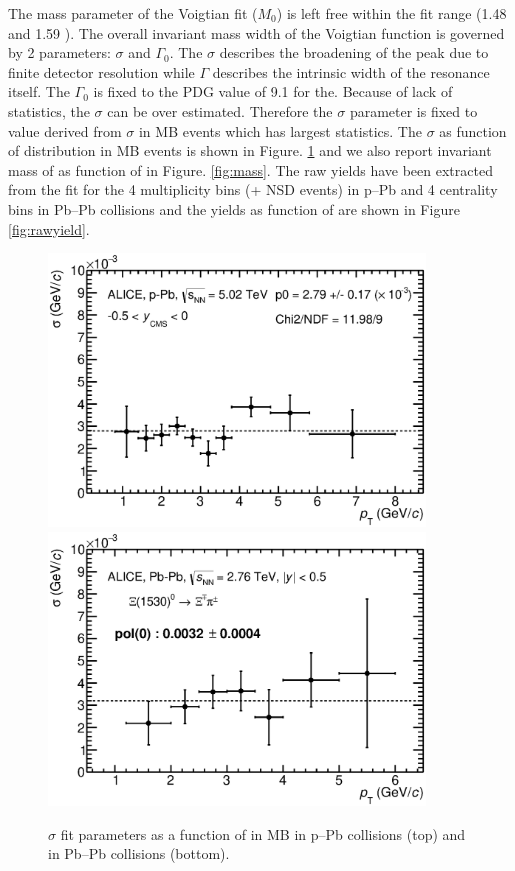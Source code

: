 The mass parameter of the Voigtian fit ($M_{0}$) is left free within the fit range (1.48 \Gmass and 1.59 \Gmass). The overall invariant mass width of the Voigtian function is governed by 2 parameters: $\sigma$ and $\Gamma_{0}$. The $\sigma$ describes the broadening of the peak due to finite detector resolution while $\Gamma$ describes the intrinsic width of the resonance itself. The $\Gamma_{0}$ is fixed to the PDG value of 9.1 \mmom for the\xis. Because of lack of statistics, the $\sigma$ can be over estimated. Therefore the $\sigma$ parameter is fixed to value derived from $\sigma$ in MB events which has largest statistics. The $\sigma$ as function of \pt distribution in MB events is shown in Figure. \ref{fig:sigma} and we also report invariant mass of \xis as function of \pt in Figure. \ref{fig:mass}. The \xis raw yields have been extracted from the fit for the 4 multiplicity bins (+ NSD events) in p--Pb and 4 centrality bins in Pb--Pb collisions and the yields as function of \pt are shown in Figure \ref{fig:rawyield}.



\begin{figure}[htbp]
\begin{center}
\includegraphics[width=10.0cm]{./Version1/FigChapter5/Extraction/pPbWidthMB.eps}
\hspace{0.5cm}
\includegraphics[width=10.0cm]{./Version1/FigChapter5/Extraction/PbPbWidthMB.eps}
\caption{$\sigma$ fit parameters as a function of \pt in MB in p--Pb collisions (top) and in Pb--Pb collisions (bottom).} 
 \label{fig:sigma}
\end{center}
\end{figure}



